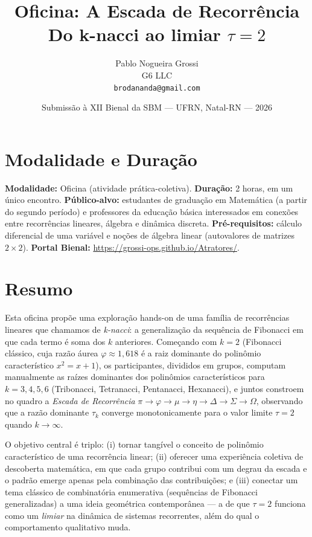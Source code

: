 \documentclass[11pt,a4paper]{article}
\title{\textbf{Oficina: A Escada de Recorrência}\\[0.3em]
\large Do k-nacci ao limiar $\tau = 2$}
\author{Pablo Nogueira Grossi\\
\small G6 LLC\\
\small \texttt{brodananda@gmail.com}}
\date{Submissão à XII Bienal da SBM --- UFRN, Natal-RN --- 2026}
\begin{document}
\maketitle

\section*{Modalidade e Duração}
\noindent
\textbf{Modalidade:} Oficina (atividade prática-coletiva).\quad
\textbf{Duração:} 2 horas, em um único encontro.\quad
\textbf{Público-alvo:} estudantes de graduação em Matemática (a partir do segundo período) e professores da educação básica interessados em conexões entre recorrências lineares, álgebra e dinâmica discreta.\quad
\textbf{Pré-requisitos:} cálculo diferencial de uma variável e noções de álgebra linear (autovalores de matrizes $2\times 2$).\quad
\textbf{Portal Bienal:} \url{https://grossi-ops.github.io/Atratores/}.

\section*{Resumo}

Esta oficina propõe uma exploração hands-on de uma família de recorrências lineares que chamamos de \emph{k-nacci}: a generalização da sequência de Fibonacci em que cada termo é soma dos $k$ anteriores. Começando com $k=2$ (Fibonacci clássico, cuja razão áurea $\varphi \approx 1{,}618$ é a raiz dominante do polinômio característico $x^2 = x + 1$), os participantes, divididos em grupos, computam manualmente as raízes dominantes dos polinômios característicos para $k = 3, 4, 5, 6$ (Tribonacci, Tetranacci, Pentanacci, Hexanacci), e juntos constroem no quadro a \emph{Escada de Recorrência} $\pi \to \varphi \to \mu \to \eta \to \Delta \to \Sigma \to \Omega$, observando que a razão dominante $\tau_k$ converge monotonicamente para o valor limite $\tau = 2$ quando $k \to \infty$.

O objetivo central é triplo: (i) tornar tangível o conceito de polinômio característico de uma recorrência linear; (ii) oferecer uma experiência coletiva de descoberta matemática, em que cada grupo contribui com um degrau da escada e o padrão emerge apenas pela combinação das contribuições; e (iii) conectar um tema clássico de combinatória enumerativa (sequências de Fibonacci generalizadas) a uma ideia geométrica contemporânea ---  a de que $\tau = 2$ funciona como um \emph{limiar} na dinâmica de sistemas recorrentes, além do qual o comportamento qualitativo muda.
\end{document}
